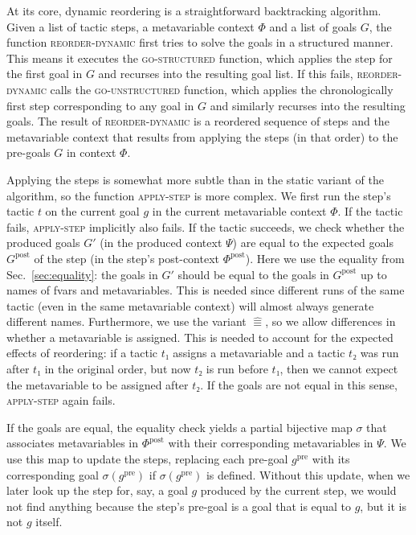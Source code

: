 \documentclass[sigplan,10pt,anonymous,review]{acmart}
\newcommand{\pre}{\mathrm{pre}}
\newcommand{\post}{\mathrm{post}}
\newcommand{\aeq}{\mathrel{\hat{≡}}}
\begin{document}
At its core, dynamic reordering is a straightforward backtracking algorithm.
Given a list of tactic steps, a metavariable context $Φ$ and a list of goals $G$, the function \textsc{reorder-dynamic} first tries to solve the goals in a structured manner.
This means it executes the \textsc{go-structured} function, which applies the step for the first goal in $G$ and recurses into the resulting goal list.
If this fails, \textsc{reorder-dynamic} calls the \textsc{go-unstructured} function, which applies the chronologically first step corresponding to any goal in $G$ and similarly recurses into the resulting goals.
The result of \textsc{reorder-dynamic} is a reordered sequence of steps and the metavariable context that results from applying the steps (in that order) to the pre-goals $G$ in context $Φ$.

Applying the steps is somewhat more subtle than in the static variant of the algorithm, so the function \textsc{apply-step} is more complex.
We first run the step's tactic $t$ on the current goal $g$ in the current metavariable context $Φ$.
If the tactic fails, \textsc{apply-step} implicitly also fails.
If the tactic succeeds, we check whether the produced goals $G'$ (in the produced context $Ψ$) are equal to the expected goals $G^{\post}$ of the step (in the step's post-context $Φ^{\post}$).
Here we use the equality from Sec.~\ref{sec:equality}: the goals in $G'$ should be equal to the goals in $G^{\post}$ up to names of fvars and metavariables.
This is needed since different runs of the same tactic (even in the same metavariable context) will almost always generate different names.
Furthermore, we use the variant $\aeq$, so we allow differences in whether a metavariable is assigned.
This is needed to account for the expected effects of reordering: if a tactic $t₁$ assigns a metavariable and a tactic $t₂$ was run after $t₁$ in the original order, but now $t₂$ is run before $t₁$, then we cannot expect the metavariable to be assigned after $t₂$.
If the goals are not equal in this sense, \textsc{apply-step} again fails.

If the goals are equal, the equality check yields a partial bijective map $σ$ that associates metavariables in $Φ^{\post}$ with their corresponding metavariables in $Ψ$.
We use this map to update the steps, replacing each pre-goal $g^{\pre}$ with its corresponding goal $σ(g^{\pre})$ if $σ(g^{\pre})$ is defined.
Without this update, when we later look up the step for, say, a goal $g$ produced by the current step, we would not find anything because the step's pre-goal is a goal that is equal to $g$, but it is not $g$ itself.
\end{document}
